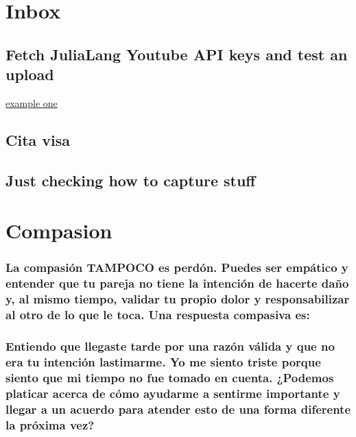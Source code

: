 \documentclass[11pt]{article}
\author{Miguel Raz Guzmán Macedo}
\date{\today}
\title{}
\begin{document}
\tableofcontents

\section{Inbox}
\label{sec:org72c038c}
\subsection{{\bfseries\sffamily [ ]} Fetch JuliaLang Youtube API keys and test an upload}
\label{sec:org2e239da}

\href{file:///home/mrg/org-basics.org}{example one}
\subsection{{\bfseries\sffamily [X]} Cita visa}
\label{sec:org965b147}
\subsection{{\bfseries\sffamily [ ]} Just checking how to capture stuff}
\label{sec:org4537c79}
\section{Compasion}
\label{sec:org4c163ab}
\subsubsection{La compasión TAMPOCO es perdón. Puedes ser empático y entender que tu pareja no tiene la intención de hacerte daño y, al mismo tiempo, validar tu propio dolor y responsabilizar al otro de lo que le toca. Una respuesta compasiva es:}
\label{sec:org105e8d3}
\subsubsection{Entiendo que llegaste tarde por una razón válida y que no era tu intención lastimarme. Yo me siento triste porque siento que mi tiempo no fue tomado en cuenta. ¿Podemos platicar acerca de cómo ayudarme a sentirme importante y llegar a un acuerdo para atender esto de una forma diferente la próxima vez?}
\label{sec:org060bf6c}
\end{document}
